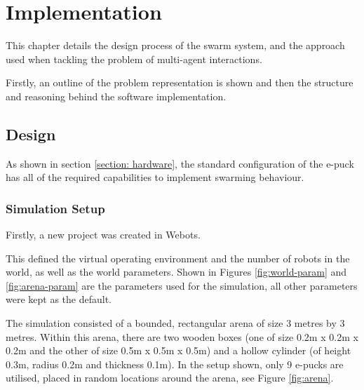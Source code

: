 \chapter{Implementation}
\label{chap:Implementation}

This chapter details the design process of the swarm system, and the approach used when tackling the problem of multi-agent interactions.

Firstly, an outline of the problem representation is shown and then the structure and reasoning behind the software implementation.
\section{Design}

As shown in section \ref{section: hardware}, the standard configuration of the e-puck has all of the required capabilities to implement swarming behaviour.

\subsection{Simulation Setup}
\label{subsection:simulation-setup}

Firstly, a new project was created in Webots.

This defined the virtual operating environment and the number of robots in the world, as well as the world parameters. Shown in Figures \ref{fig:world-param} and \ref{fig:arena-param} are the parameters used for the simulation, all other parameters were kept as the default.

The simulation consisted of a bounded, rectangular arena of size 3 metres by 3 metres. Within this arena, there are two wooden boxes (one of size 0.2m x 0.2m x 0.2m and the other of size 0.5m x 0.5m x 0.5m) and a hollow cylinder (of height 0.3m, radius 0.2m and thickness 0.1m). In the setup shown, only 9 e-pucks are utilised, placed in random locations around the arena, see Figure \ref{fig:arena}.

